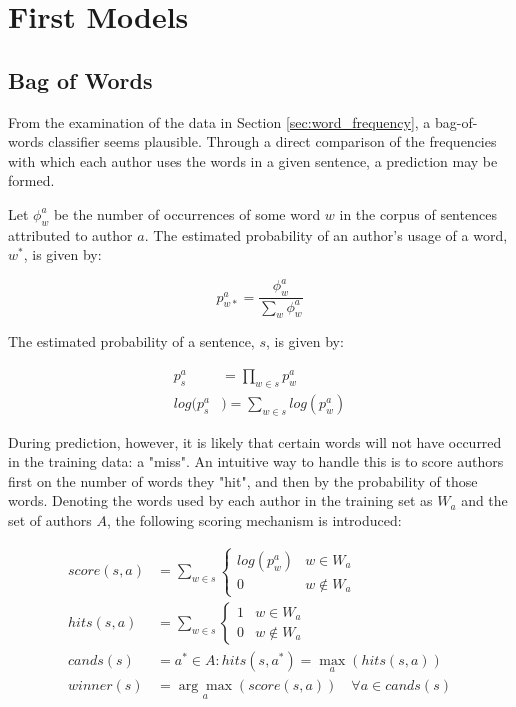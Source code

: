 \section{First Models}
\label{sec:first_models}

\subsection{Bag of Words}
\label{sec:bag_of_words}
From the examination of the data in Section \ref{sec:word_frequency}, a bag-of-words classifier seems plausible. Through a direct comparison of the frequencies with which each author uses the words in a given sentence, a prediction may be formed.

Let $\phi_w^a$ be the number of occurrences of some word $w$ in the corpus of sentences attributed to author $a$. The estimated probability of an author's usage of a word, $w^*$, is given by:

\begin{equation*}
p_{w*}^a = \frac{\phi_w^a}{\sum\limits_{w} \phi_w^a}
\end{equation*}

The estimated probability of a sentence, $s$, is given by:

\begin{align*}
p_{s}^a &= \prod\limits_{w\in s} p_{w}^a \\
log(p_{s}^a &)= \sum\limits_{w\in s} log(p_{w}^a)
\end{align*}

During prediction, however, it is likely that certain words will not have occurred in the training data: a "miss". An intuitive way to handle this is to score authors first on the number of words they "hit", and then by the probability of those words. Denoting the words used by each author in the training set as $W_a$ and the set of authors $A$, the following scoring mechanism is introduced:

\begin{align*}
score(s,a) &= \sum\limits_{w\in s}
\begin{cases}
log(p_{w}^a) & w\in W_a \\
0 & w \not\in W_a
\end{cases}\\
hits(s,a) &= \sum\limits_{w\in s}
\begin{cases}
1 & w\in W_a \\
0 & w \not\in W_a
\end{cases}\\
cands(s) &= a^* \in A : hits(s,a^*) = \max_a(hits(s,a))\\
winner(s) &= \underset{a}{\arg\max}(score(s,a))\quad \forall a \in cands(s)
\end{align*}


